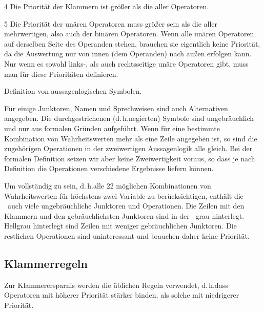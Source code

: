 \documentclass[english,ngerman,parskip=half,headsepline,footsepline,
	fleqn,notitlepage]{scrreprt}
\makeatletter
\newcommand*{\textdh}{d.\@\,h.\@ }
\makeatother
\begin{document}
\begin{table}
\begin{threeparttable}
\begin{tablenotes}
				\item[4] Die Priorität der Klammern
				ist größer als die aller Operatoren.

				\item[5] Die Priorität der unären Operatoren
				muss größer sein als die aller mehrwertigen,
				also auch der binären Operatoren.
				Wenn alle unären Operatoren
				auf derselben Seite des Operanden stehen,
				brauchen sie eigentlich keine Priorität,
				da die Auswertung nur von innen (dem Operanden)
				nach außen erfolgen kann.
				Nur wenn es sowohl links-, als auch rechtsseitige
				unäre Operatoren gibt,
				muss man für diese Prioritäten definieren.

			\end{tablenotes}
			\caption{Definition von aussagenlogischen Symbolen.}
			\label{tab:Symbole}
		\end{threeparttable}
	\end{table}

	Für einige Junktoren, Namen und Sprechweisen
	sind auch Alternativen angegeben.
	Die durchgestrichenen (\textdh negierten) Symbole sind ungebräuchlich
	und nur aus formalen Gründen aufgeführt.
	Wenn für eine bestimmte Kombination von Wahrheitswerten
	mehr als eine Zeile angegeben ist,
	so sind die zugehörigen Operationen
	in der zweiwertigen Aussagenlogik alle gleich.
	Bei der formalen Definition setzen wir aber keine Zweiwertigkeit voraus,
	so dass je nach Definition
	die Operationen verschiedene Ergebnisse liefern können.

	Um vollständig zu sein,
	\textdh alle 22 möglichen Kombinationen von Wahrheitswerten
	für höchstens zwei Variable zu berücksichtigen,
	enthält die \tablename\
	auch viele ungebräuchliche Junktoren und Operationen.
	Die Zeilen mit den Klammern und den gebräuchlichsten Junktoren
	sind in der \tablename\ grau hinterlegt.
	Hellgrau hinterlegt sind Zeilen mit weniger gebräuchlichen Junktoren.
	Die restlichen Operationen sind uninteressant
	und brauchen daher keine Priorität.

	\subsection{Klammerregeln}%
	\label{sub:Klammerregeln}

	Zur Klammerersparnis werden die üblichen Regeln verwendet,
	\textdh dass Operatoren mit höherer Priorität stärker binden,
	als solche mit niedrigerer Priorität.
\end{document}
